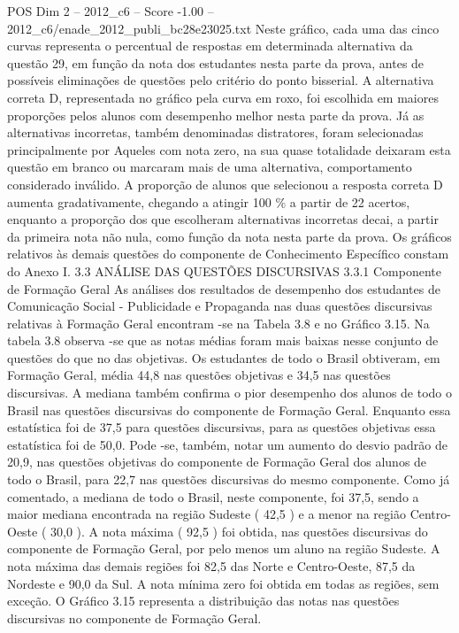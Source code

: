 \begin{textsample}{POS Dim 2 – 2012\_c6 – Score -1.00 – 2012\_c6/enade\_2012\_publi\_bc28e23025.txt}
Neste gráfico, cada uma das cinco curvas representa o percentual de respostas em determinada alternativa da questão 29, em função da nota dos estudantes nesta parte da prova, antes de possíveis eliminações de questões pelo critério do ponto bisserial.
A alternativa correta D, representada no gráfico pela curva em roxo, foi escolhida em maiores proporções pelos alunos com desempenho melhor nesta parte da prova.
Já as alternativas incorretas, também denominadas distratores, foram selecionadas principalmente por Aqueles com nota zero, na sua quase totalidade deixaram esta questão em branco ou marcaram mais de uma alternativa, comportamento considerado inválido.
A proporção de alunos que selecionou a resposta correta D aumenta gradativamente, chegando a atingir 100 \% a partir de 22 acertos, enquanto a proporção dos que escolheram alternativas incorretas decai, a partir da primeira nota não nula, como função da nota nesta parte da prova.
Os gráficos relativos às demais questões do componente de Conhecimento Específico constam do Anexo I. 3.3 ANÁLISE DAS QUESTÕES DISCURSIVAS 3.3.1 Componente de Formação Geral As análises dos resultados de desempenho dos estudantes de Comunicação Social - Publicidade e Propaganda nas duas questões discursivas relativas à Formação Geral encontram -se na Tabela 3.8 e no Gráfico 3.15.
Na tabela 3.8 observa -se que as notas médias foram mais baixas nesse conjunto de questões do que no das objetivas.
Os estudantes de todo o Brasil obtiveram, em Formação Geral, média 44,8 nas questões objetivas e 34,5 nas questões discursivas.
A mediana também confirma o pior desempenho dos alunos de todo o Brasil nas questões discursivas do componente de Formação Geral.
Enquanto essa estatística foi de 37,5 para questões discursivas, para as questões objetivas essa estatística foi de 50,0.
Pode -se, também, notar um aumento do desvio padrão de 20,9, nas questões objetivas do componente de Formação Geral dos alunos de todo o Brasil, para 22,7 nas questões discursivas do mesmo componente.
Como já comentado, a mediana de todo o Brasil, neste componente, foi 37,5, sendo a maior mediana encontrada na região Sudeste ( 42,5 ) e a menor na região Centro-Oeste ( 30,0 ).
A nota máxima ( 92,5 ) foi obtida, nas questões discursivas do componente de Formação Geral, por pelo menos um aluno na região Sudeste.
A nota máxima das demais regiões foi 82,5 das Norte e Centro-Oeste, 87,5 da Nordeste e 90,0 da Sul.
A nota mínima zero foi obtida em todas as regiões, sem exceção.
O Gráfico 3.15 representa a distribuição das notas nas questões discursivas no componente de Formação Geral.

\end{textsample}
